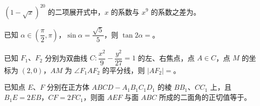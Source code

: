 \begin{question}
$(1-\sqrt{x})^{20}$ 的二项展开式中，$x$ 的系数与 $x^9$ 的系数之差为\gkblank{}。

\end{question}
\begin{question}
已知 $\alpha\in\left(\dfrac\pi2,\pi\right)$，$\sin\alpha=\dfrac{\sqrt5}{5}$，则 $\tan2\alpha=$\gkblank{}。

\end{question}
\begin{question}
已知 $F_1\text{、}F_2$ 分别为双曲线 $C:\dfrac{x^2}{9}-\dfrac{y^2}{27}=1$ 的左、右焦点，点 $A\in C$，点 $M$ 的坐标为 $(2,0)$，$AM$ 为 $\angle F_1AF_2$ 的平分线，则 $|AF_2|=$\gkblank{}。

\end{question}
\begin{question}
已知点 $E\text{、}F$ 分别在正方体 $ABCD-A_1B_1C_1D_1$ 的棱 $BB_1\text{、}CC_1$ 上，且 $B_1E=2EB$，$CF=2FC_1$，则面 $AEF$ 与面 $ABC$ 所成的二面角的正切值等于\gkblank{}。

\end{question}

